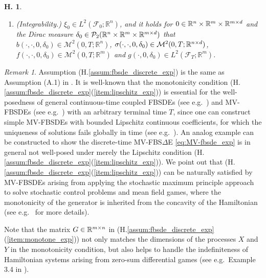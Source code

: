 \documentclass[11pt]{article}
\numberwithin{equation}{section}
\newtheorem{Assumption}{H.\!\!}
\theoremstyle{definition}
\theoremstyle{remark}
\newtheorem{Remark}{Remark}[section]
\def\l{\label}  \def\f{\frac}  \def\fa{\forall}
\def\cF{\mathcal{F}}
\def\cM{\mathcal{M}}
\def\cP{\mathcal{P}}
\def\sR{{\mathbb R}}
\newcommand{\fbsde}{FBS$\Delta$E }
\newcommand{\todo}[1]{{\color{red} \fbox{#1}}}
\begin{document}
\begin{Assumption}
\begin{enumerate}[(1)]
 \item {(Integrability.)}\l{item:integrable_exp}
 $\xi_0\in L^2(\cF_0;\sR^n)$,
 and
it holds 
 for $0\in \sR^n\t \sR^m\t \sR^{m\t d}$
and the Dirac measure $\delta_0\in \cP_2(\sR^n\t \sR^m\t \sR^{m\t d})$
  that 
 $b(\cdot,\cdot,0,\delta_0)\in \cM^2(0, T; \sR^{n})$,
  $\sigma(\cdot,\cdot,0,\delta_0)\in \cM^2(0, T; \sR^{n\t d})$,
 $f(\cdot,\cdot,0,\delta_0)\in \cM^2(0, T; \sR^{m})$
 and $g(\cdot,0,\delta_0)\in L^2(\cF_T;\sR^m)$.
 \end{enumerate}
\end{Assumption}

\begin{Remark}

Assumption (H.\ref{assum:fbsde_discrete_exp}) is the same as Assumption (A.1) in \cite{bensoussan2015}.
It is well-known  that 
the monotonicity condition 
(H.\ref{assum:fbsde_discrete_exp}(\ref{item:lipschitz_exp}))
is essential for the well-posedness of general continuous-time 
coupled FBSDEs (see e.g.~\cite{peng1999})
and
MV-FBSDEs (see e.g.~\cite{bensoussan2015}) with an arbitrary terminal time $T$,
since one can construct  simple MV-FBSDEs with bounded Lipschitz continuous coefficients,
for which  the uniqueness of solutions fails 
globally in time
(see e.g.~\cite{carmona2013}).
An  analog example can be constructed to show 
the 
discrete-time
MV-\fbsde 
\eqref{eq:MV-fbsde_exp}  is in general not well-posed under merely the Lipschitz condition  (H.\ref{assum:fbsde_discrete_exp}(\ref{item:lipschitz_exp})).
We point out that
(H.\ref{assum:fbsde_discrete_exp}(\ref{item:lipschitz_exp}))
can be naturally satisfied by MV-FBSDEs 
arising from 
applying 
the stochastic maximum principle approach
to solve stochastic control problems and mean field games,
where the monotonicity of the generator  is inherited  from the concavity of the Hamiltonian 
(see e.g.~\cite{peng1999,bensoussan2015,carmona2015} for more details).

Note that the matrix $G\in \sR^{m\t n}$ in  (H.\ref{assum:fbsde_discrete_exp}(\ref{item:monotone_exp}))
not only 
matches the dimensions of the processes $X$ and $Y$
in the monotonicity condition,
but also helps to handle the indefiniteness of Hamiltonian systems
arising from zero-sum differential games
(see e.g.~Example 3.4 in \cite{peng1999}).

\end{Remark}
% 
\end{document}
